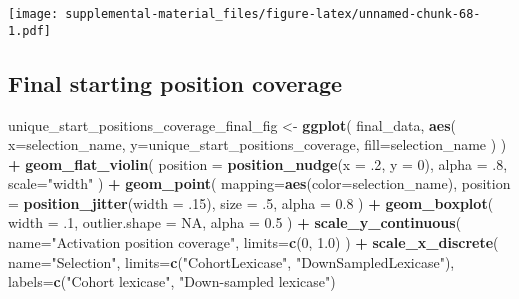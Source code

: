 \documentclass[]{book}
\newenvironment{Shaded}{\begin{snugshade}}{\end{snugshade}}
\newcommand{\DataTypeTok}[1]{\textcolor[rgb]{0.13,0.29,0.53}{#1}}
\newcommand{\DecValTok}[1]{\textcolor[rgb]{0.00,0.00,0.81}{#1}}
\newcommand{\FloatTok}[1]{\textcolor[rgb]{0.00,0.00,0.81}{#1}}
\newcommand{\KeywordTok}[1]{\textcolor[rgb]{0.13,0.29,0.53}{\textbf{#1}}}
\newcommand{\NormalTok}[1]{#1}
\newcommand{\OperatorTok}[1]{\textcolor[rgb]{0.81,0.36,0.00}{\textbf{#1}}}
\newcommand{\OtherTok}[1]{\textcolor[rgb]{0.56,0.35,0.01}{#1}}
\newcommand{\StringTok}[1]{\textcolor[rgb]{0.31,0.60,0.02}{#1}}
\begin{document}
\texttt{[image: supplemental-material\_files/figure-latex/unnamed-chunk-68-1.pdf]}

\hypertarget{final-starting-position-coverage-5}{%
\subsection{Final starting position coverage}\label{final-starting-position-coverage-5}}

\begin{Shaded}
\begin{Highlighting}[]
\NormalTok{unique_start_positions_coverage_final_fig <-}\StringTok{ }\KeywordTok{ggplot}\NormalTok{(}
\NormalTok{    final_data,}
    \KeywordTok{aes}\NormalTok{(}
      \DataTypeTok{x=}\NormalTok{selection_name,}
      \DataTypeTok{y=}\NormalTok{unique_start_positions_coverage,}
      \DataTypeTok{fill=}\NormalTok{selection_name}
\NormalTok{    )}
\NormalTok{  ) }\OperatorTok{+}
\StringTok{  }\KeywordTok{geom_flat_violin}\NormalTok{(}
    \DataTypeTok{position =} \KeywordTok{position_nudge}\NormalTok{(}\DataTypeTok{x =} \FloatTok{.2}\NormalTok{, }\DataTypeTok{y =} \DecValTok{0}\NormalTok{),}
    \DataTypeTok{alpha =} \FloatTok{.8}\NormalTok{,}
    \DataTypeTok{scale=}\StringTok{"width"}
\NormalTok{  ) }\OperatorTok{+}
\StringTok{  }\KeywordTok{geom_point}\NormalTok{(}
    \DataTypeTok{mapping=}\KeywordTok{aes}\NormalTok{(}\DataTypeTok{color=}\NormalTok{selection_name),}
    \DataTypeTok{position =} \KeywordTok{position_jitter}\NormalTok{(}\DataTypeTok{width =} \FloatTok{.15}\NormalTok{),}
    \DataTypeTok{size =} \FloatTok{.5}\NormalTok{,}
    \DataTypeTok{alpha =} \FloatTok{0.8}
\NormalTok{  ) }\OperatorTok{+}
\StringTok{  }\KeywordTok{geom_boxplot}\NormalTok{(}
    \DataTypeTok{width =} \FloatTok{.1}\NormalTok{,}
    \DataTypeTok{outlier.shape =} \OtherTok{NA}\NormalTok{,}
    \DataTypeTok{alpha =} \FloatTok{0.5}
\NormalTok{  ) }\OperatorTok{+}
\StringTok{  }\KeywordTok{scale_y_continuous}\NormalTok{(}
    \DataTypeTok{name=}\StringTok{"Activation position coverage"}\NormalTok{,}
    \DataTypeTok{limits=}\KeywordTok{c}\NormalTok{(}\DecValTok{0}\NormalTok{, }\FloatTok{1.0}\NormalTok{)}
\NormalTok{  ) }\OperatorTok{+}
\StringTok{  }\KeywordTok{scale_x_discrete}\NormalTok{(}
    \DataTypeTok{name=}\StringTok{"Selection"}\NormalTok{,}
    \DataTypeTok{limits=}\KeywordTok{c}\NormalTok{(}\StringTok{"CohortLexicase"}\NormalTok{, }\StringTok{"DownSampledLexicase"}\NormalTok{),}
    \DataTypeTok{labels=}\KeywordTok{c}\NormalTok{(}\StringTok{"Cohort lexicase"}\NormalTok{, }\StringTok{"Down-sampled lexicase"}\NormalTok{)}

\end{Highlighting}
\end{Shaded}
\end{document}
